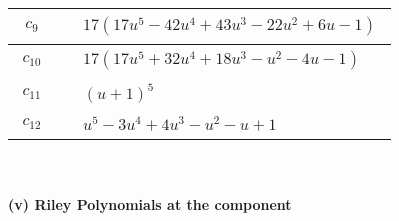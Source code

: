 \documentclass[1p]{elsarticle_modified}
\theoremstyle{definition}
\begin{document}
\begin{tabular}{m{50pt}|m{274pt}}
\hline $$\begin{aligned}c_{9}\end{aligned}$$&$\begin{aligned}
&17(17 u^5-42 u^4+43 u^3-22 u^2+6 u-1)
\end{aligned}$\\
\hline $$\begin{aligned}c_{10}\end{aligned}$$&$\begin{aligned}
&17(17 u^5+32 u^4+18 u^3- u^2-4 u-1)
\end{aligned}$\\
\hline $$\begin{aligned}c_{11}\end{aligned}$$&$\begin{aligned}
&(u+1)^5
\end{aligned}$\\
\hline $$\begin{aligned}c_{12}\end{aligned}$$&$\begin{aligned}
&u^5-3 u^4+4 u^3- u^2- u+1
\end{aligned}$\\
\hline
\end{tabular}\\~\\
\newpage\renewcommand{\arraystretch}{1}
\flushleft \textbf{(v) Riley Polynomials at the component}\newline \\
\end{document}
